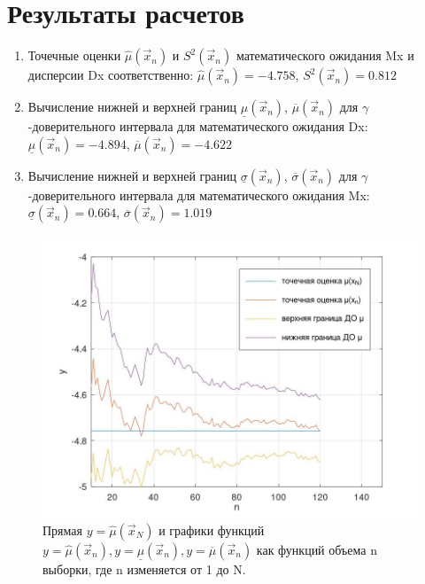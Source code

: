 \chapter{Результаты расчетов}
\begin{enumerate}
	\item Точечные оценки $\hat \mu (\vec x_n)$ и $ S^2 (\vec x_n)$ математического ожидания Mx и дисперсии Dx соответственно: $\hat \mu (\vec x_n) = -4.758$, $ S^2 (\vec x_n) = 0.812$
	\item Вычисление нижней и верхней границ $\underline \mu (\vec x_n)$, 
	$\overline \mu (\vec x_n)$ для $\gamma$-доверительного интервала для математического ожидания Dx: 
	$\underline \mu (\vec x_n) = -4.894$, $\overline\mu (\vec x_n) = -4.622$

	\item Вычисление нижней и верхней границ $\underline \sigma (\vec x_n)$, 
	$\overline \sigma (\vec x_n)$ для $\gamma$-доверительного интервала для математического ожидания Mx: 
	$\underline \sigma (\vec x_n) = 0.664$, $\overline \sigma (\vec x_n) = 1.019$
\end{enumerate}

\begin{figure}[ht!]
		\centering
		\includegraphics[scale=0.4]{assets/g-1.jpg}
		\caption{Прямая $y=\hat \mu (\vec x_N)$ и графики функций $y=\hat \mu (\vec x_n), y= \underline \mu (\vec x_n), y =\overline \mu (\vec x_n)$ как функций объема n выборки, где n изменяется от 1 до N.}
\end{figure}

